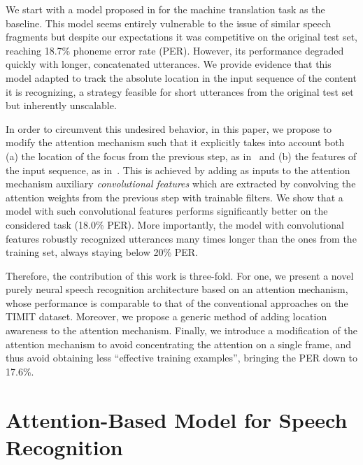 \documentclass{article} %
\begin{document}
We start with a model proposed in
\cite{bahdanau_neural_2014} for the machine translation task
as the baseline. This model seems entirely vulnerable to
the issue of similar speech fragments 
but despite our
expectations it was competitive on the original test set, reaching 18.7\% phoneme
error rate (PER). However, its performance
degraded quickly with longer, concatenated utterances. We
provide evidence that this model adapted to track the absolute
location in the input sequence of the content it is
recognizing, a strategy feasible for short utterances from the
original test set but inherently unscalable.

In order to circumvent this undesired behavior, in this
paper, we propose to modify the attention mechanism such
that it explicitly takes into account both (a) the location of the
focus from the previous step, as in~\cite{graves_2014} and (b)
the features of the input sequence, as in~\cite{bahdanau_neural_2014}. 
This is achieved by adding as inputs to the attention mechanism
auxiliary {\it convolutional features} which are extracted 
by convolving the attention
weights from the previous step with trainable filters.  We show that a model
with such convolutional features performs significantly
better on the considered task (18.0\% PER). More
importantly, the model with convolutional features robustly
recognized utterances many times longer than the ones
from the training set, always staying below 20\% PER.


Therefore, the contribution of this work is three-fold. For one, we present a
novel purely neural speech recognition architecture based on an attention
mechanism, whose performance is comparable to that of the conventional
approaches on the TIMIT dataset.  Moreover, we propose a generic method of
adding location awareness to the attention mechanism. Finally, we introduce a
modification of the attention mechanism to avoid concentrating the attention on
a single frame, and thus avoid obtaining less ``effective training examples'',
bringing the PER down to 17.6\%.

\section{Attention-Based Model for Speech Recognition}
\end{document}
